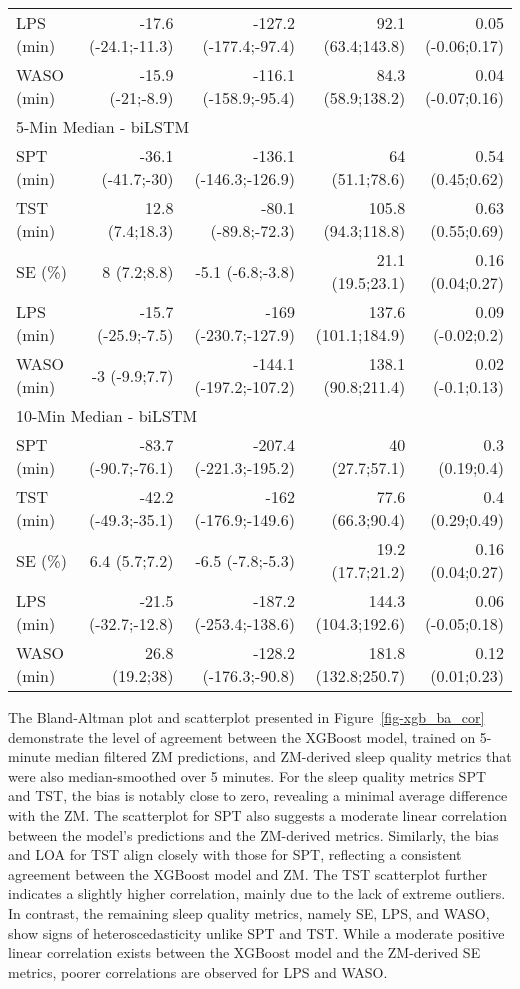 \documentclass[
  9pt,
]{scrbook}
\begin{document}
\begin{longtable}{lrrrr}
LPS (min) & -17.6 (-24.1;-11.3) & -127.2 (-177.4;-97.4) & 92.1 (63.4;143.8) & 0.05 (-0.06;0.17) \\ 
WASO (min) & -15.9 (-21;-8.9) & -116.1 (-158.9;-95.4) & 84.3 (58.9;138.2) & 0.04 (-0.07;0.16) \\ 
\midrule
\multicolumn{5}{l}{5-Min Median - biLSTM} \\ 
\midrule
SPT (min) & -36.1 (-41.7;-30) & -136.1 (-146.3;-126.9) & 64 (51.1;78.6) & 0.54 (0.45;0.62) \\ 
TST (min) & 12.8 (7.4;18.3) & -80.1 (-89.8;-72.3) & 105.8 (94.3;118.8) & 0.63 (0.55;0.69) \\ 
SE (\%) & 8 (7.2;8.8) & -5.1 (-6.8;-3.8) & 21.1 (19.5;23.1) & 0.16 (0.04;0.27) \\ 
LPS (min) & -15.7 (-25.9;-7.5) & -169 (-230.7;-127.9) & 137.6 (101.1;184.9) & 0.09 (-0.02;0.2) \\ 
WASO (min) & -3 (-9.9;7.7) & -144.1 (-197.2;-107.2) & 138.1 (90.8;211.4) & 0.02 (-0.1;0.13) \\ 
\midrule
\multicolumn{5}{l}{10-Min Median - biLSTM} \\ 
\midrule
SPT (min) & -83.7 (-90.7;-76.1) & -207.4 (-221.3;-195.2) & 40 (27.7;57.1) & 0.3 (0.19;0.4) \\ 
TST (min) & -42.2 (-49.3;-35.1) & -162 (-176.9;-149.6) & 77.6 (66.3;90.4) & 0.4 (0.29;0.49) \\ 
SE (\%) & 6.4 (5.7;7.2) & -6.5 (-7.8;-5.3) & 19.2 (17.7;21.2) & 0.16 (0.04;0.27) \\ 
LPS (min) & -21.5 (-32.7;-12.8) & -187.2 (-253.4;-138.6) & 144.3 (104.3;192.6) & 0.06 (-0.05;0.18) \\ 
WASO (min) & 26.8 (19.2;38) & -128.2 (-176.3;-90.8) & 181.8 (132.8;250.7) & 0.12 (0.01;0.23) \\ 
\bottomrule
\end{longtable}

\endgroup

The Bland-Altman plot and scatterplot presented in
Figure~\ref{fig-xgb_ba_cor} demonstrate the level of agreement between
the XGBoost model, trained on 5-minute median filtered ZM predictions,
and ZM-derived sleep quality metrics that were also median-smoothed over
5 minutes. For the sleep quality metrics SPT and TST, the bias is
notably close to zero, revealing a minimal average difference with the
ZM. The scatterplot for SPT also suggests a moderate linear correlation
between the model's predictions and the ZM-derived metrics. Similarly,
the bias and LOA for TST align closely with those for SPT, reflecting a
consistent agreement between the XGBoost model and ZM. The TST
scatterplot further indicates a slightly higher correlation, mainly due
to the lack of extreme outliers. In contrast, the remaining sleep
quality metrics, namely SE, LPS, and WASO, show signs of
heteroscedasticity unlike SPT and TST. While a moderate positive linear
correlation exists between the XGBoost model and the ZM-derived SE
metrics, poorer correlations are observed for LPS and WASO.
\end{document}
